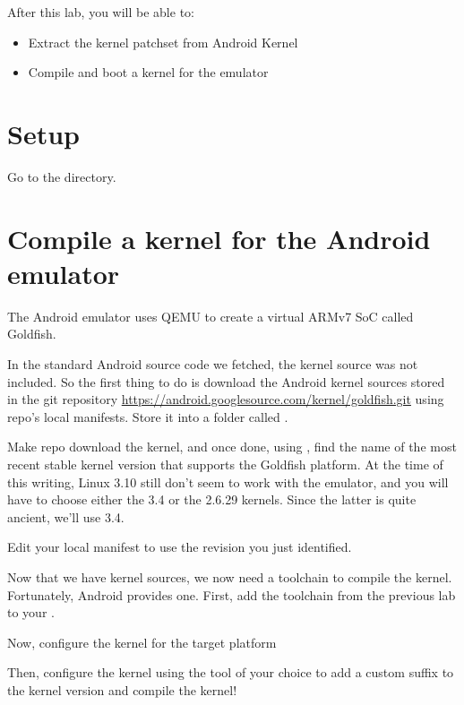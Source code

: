 
After this lab, you will be able to:
\begin{itemize}
  \item Extract the kernel patchset from Android Kernel
  \item Compile and boot a kernel for the emulator
\end{itemize}

\section{Setup}

Go to the  directory.

\section{Compile a kernel for the Android emulator}

The Android emulator uses QEMU to create a virtual ARMv7 SoC called
Goldfish.

In the standard Android source code we fetched, the kernel source was
not included.  So the first thing to do is download the Android kernel
sources stored in the git repository
\url{https://android.googlesource.com/kernel/goldfish.git} using
repo's local manifests. Store it into a folder called .

Make repo download the kernel, and once done, using , find the name of the most recent stable kernel version that
supports the Goldfish platform. At the time of this writing, Linux
3.10 still don't seem to work with the emulator, and you will have to
choose either the 3.4 or the 2.6.29 kernels. Since the latter is quite
ancient, we'll use 3.4.

Edit your local manifest to use the revision you just identified.

Now that we have kernel sources, we now need a toolchain to compile
the kernel. Fortunately, Android provides one. First, add the
toolchain from the previous lab to your .


Now, configure the kernel for the target platform


Then, configure the kernel using the tool of your choice to add a
custom suffix to the kernel version and compile the kernel!

